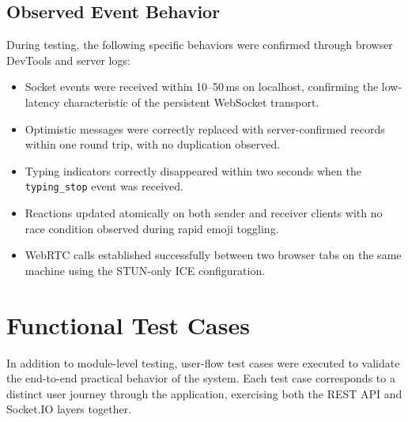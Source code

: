 \documentclass[12pt,a4paper,oneside]{report}
\begin{document}
\subsection{Observed Event Behavior}
\label{subsec:event-behavior}

During testing, the following specific behaviors were confirmed through
browser DevTools and server logs:
\begin{itemize}
  \item Socket events were received within 10--50\,ms on localhost, confirming
        the low-latency characteristic of the persistent WebSocket transport.
  \item Optimistic messages were correctly replaced with server-confirmed records
        within one round trip, with no duplication observed.
  \item Typing indicators correctly disappeared within two seconds when the
        \texttt{typing\_stop} event was received.
  \item Reactions updated atomically on both sender and receiver clients with
        no race condition observed during rapid emoji toggling.
  \item WebRTC calls established successfully between two browser tabs on the
        same machine using the STUN-only ICE configuration.
\end{itemize}

\section{Functional Test Cases}
\label{sec:functional-test-cases}

In addition to module-level testing, user-flow test cases were executed to
validate the end-to-end practical behavior of the system. Each test case
corresponds to a distinct user journey through the application, exercising
both the REST API and Socket.IO layers together.
\end{document}
